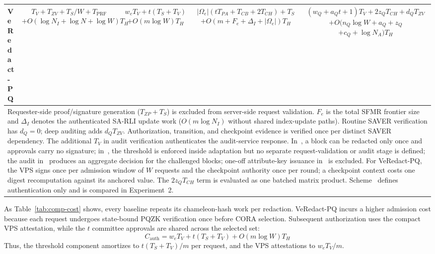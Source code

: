 \documentclass[lettersize,journal]{IEEEtran}
\begin{document}
\begin{table}[t]
\begin{adjustbox}{max width=\textwidth}
\begin{tabular}{lcccc}
\midrule
\textbf{VeRedact-PQ}
& \makecell{$T_V+T_{ZV}+T_S/W+T_{\mathrm{PRF}}$\\
$+O(\log N_I+\log N+\log W)T_H$}
& \makecell{$w_eT_V+t(T_S+T_V)$\\
$+O(m\log W)T_H$}
& \makecell{$|\Omega_e|(tT_{PA}+T_{CB}+2T_{CH})+T_S$\\
$+O(m+F_e+\Delta_I+|\Omega_e|)T_H$}
& \makecell{$(w_Q+a_Qt+1)T_V+2z_QT_{CH}+d_QT_{ZV}$\\
$+O(n_Q\log W+a_Q+z_Q$\\
$+c_Q+\log N_A)T_H$} \\

\bottomrule
\multicolumn{5}{p{0.96\textwidth}}{\footnotesize
Requester-side proof/signature generation ($T_{ZP}+T_S$) is excluded
from server-side request validation. $F_e$ is the total SFMR frontier
size and $\Delta_I$ denotes the authenticated SA-RLI update work
($O(m\log N_I)$ without shared index-update paths). Routine SAVER
verification has $d_Q=0$; deep auditing adds $d_QT_{ZV}$.
Authorization, transition, and checkpoint evidence is verified once
per distinct SAVER dependency. The additional $T_V$ in audit
verification authenticates the audit-service response. In~\cite{ref1},
a block can be redacted only once and approvals carry no signature;
in~\cite{ref27}, the threshold is enforced inside adaptation but no
separate request-validation or audit stage is defined; the audit
in~\cite{ref13} produces an aggregate decision for the challenged
blocks; one-off attribute-key issuance in~\cite{ref34} is excluded.
For VeRedact-PQ, the VPS signs once per admission window
of $W$ requests and the checkpoint authority once per round; a checkpoint
context costs one digest recomputation against its anchored value. The
$2z_QT_{CH}$ term is evaluated as one batched matrix product. Scheme~\cite{ref39} defines authentication only and is compared in
Experiment~2.}
\end{tabular}
\end{adjustbox}
\end{table}

As Table~\ref{tab:comp-cost} shows, every baseline repeats its
chameleon-hash work per redaction. VeRedact-PQ incurs a higher admission cost because each request
undergoes state-bound PQZK verification once before CORA selection.
Subsequent authorization uses the compact VPS attestation, while the
$t$ committee approvals are shared across the selected set:
\begin{equation}
C_{\mathrm{auth}}
=
w_eT_V+t(T_S+T_V)+O(m\log W)T_H
\label{eq:cauth}
\end{equation}
Thus, the threshold component amortizes to
$t(T_S+T_V)/m$ per request, and the VPS attestations to
$w_eT_V/m$.
\end{document}
